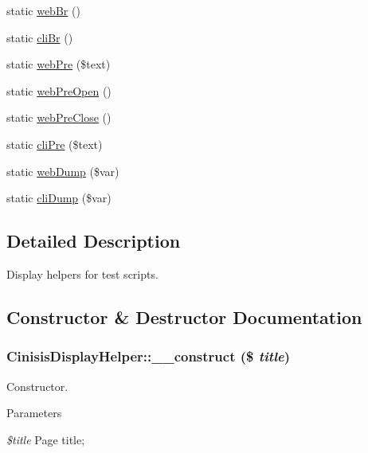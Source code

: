 \begin{DoxyCompactItemize}
static \hyperlink{classCinisisDisplayHelper_a9c8b637e47e4263901baf4c5f2064d8d}{webBr} ()
\item 
static \hyperlink{classCinisisDisplayHelper_ad61db99c9d639678c96879aa34288323}{cliBr} ()
\item 
static \hyperlink{classCinisisDisplayHelper_a528283a8b16090918f1878dca5ee24fb}{webPre} (\$text)
\item 
static \hyperlink{classCinisisDisplayHelper_a9c2a28e3865e8b3950b428770a132aa0}{webPreOpen} ()
\item 
static \hyperlink{classCinisisDisplayHelper_af4d61af3ed8211300032a208175d72ed}{webPreClose} ()
\item 
static \hyperlink{classCinisisDisplayHelper_a50bf73bd3722766cbae1b46b3092453d}{cliPre} (\$text)
\item 
static \hyperlink{classCinisisDisplayHelper_a7811830062abc85b90cf391a9ff89fdf}{webDump} (\$var)
\item 
static \hyperlink{classCinisisDisplayHelper_abd525c7b612f9dce348bb1479470b445}{cliDump} (\$var)
\end{DoxyCompactItemize}


\subsection{Detailed Description}
Display helpers for test scripts. 

\subsection{Constructor \& Destructor Documentation}
\hypertarget{classCinisisDisplayHelper_ae60a4cc7ad15109c83b3d934f89b283e}{
\subsubsection[{\_\-\_\-construct}]{\setlength{\rightskip}{0pt plus 5cm}CinisisDisplayHelper::\_\-\_\-construct (\$ {\em title})}}
\label{classCinisisDisplayHelper_ae60a4cc7ad15109c83b3d934f89b283e}
Constructor.


\begin{DoxyParams}{Parameters}
\item[{\em \$title}]Page title; \end{DoxyParams}


